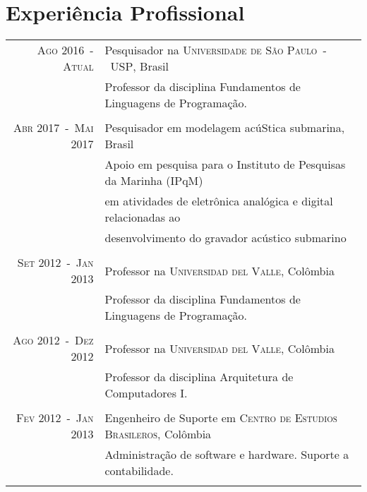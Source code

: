 \documentclass[a4paper,10pt]{article}
\begin{document}
\section{Experiência Profissional}
\begin{tabular}{rl}

    \textsc{Ago 2016~-~Atual}       & Pesquisador na \textsc{Universidade de São Paulo~-~USP}, Brasil \\
                                    &\footnotesize{Professor da disciplina Fundamentos de Linguagens de Programação.} \\
                                    &\\

    \textsc{Abr 2017~-~Mai 2017}    & Pesquisador em modelagem acúStica submarina, Brasil \\
                                    &\footnotesize{Apoio em pesquisa para o Instituto de Pesquisas da Marinha (IPqM)} \\
                                    &\footnotesize{em atividades de eletrônica analógica e digital relacionadas ao} \\
                                    &\footnotesize{desenvolvimento do gravador acústico submarino} \\
                                    &\\

    \textsc{Set 2012~-~Jan 2013}    & Professor na \textsc{Universidad del Valle}, Colômbia \\
                                    &\footnotesize{Professor da disciplina Fundamentos de Linguagens de Programação.} \\
                                    &\\

    \textsc{Ago 2012~-~Dez 2012}    & Professor na \textsc{Universidad del Valle}, Colômbia \\
                                    &\footnotesize{Professor da disciplina Arquitetura de Computadores I.} \\
                                    &\\

    \textsc{Fev 2012~-~Jan 2013}    & Engenheiro de Suporte em \textsc{Centro de Estudios Brasileros}, Colômbia \\
                                    &\footnotesize{Administração de software e hardware. Suporte a contabilidade.} \\
                                    &\\

\end{tabular}
\end{document}
